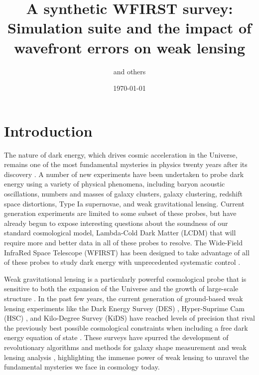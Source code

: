\documentclass[aps,prd, amsmath,amssymb,superscriptaddress,showkeys,nofootinbib,reprint,preprintnumbers]{revtex4-1}
\begin{document}
\title{A synthetic WFIRST survey: Simulation suite and the impact of wavefront errors on weak lensing}

\author{and others}


\noaffiliation

\date{\today}

\label{firstpage}

\begin{abstract}

\end{abstract}

\keywords{}

\maketitle


\section{Introduction}\label{sec:intro}

The nature of dark energy, which drives cosmic acceleration in the Universe, remains one of the most fundamental mysteries in physics twenty years after its discovery \cite{riess98,perlmutter99,detf,Frieman:2008sn,weinberg13}. 
A number of new experiments have been undertaken to probe dark energy using a variety of physical phenomena, including baryon acoustic oscillations, numbers and masses of galaxy clusters, galaxy clustering, redshift space distortions, Type Ia supernovae, and weak gravitational lensing. 
Current generation experiments are limited to some subset of these probes, but have already begun to expose interesting questions about the soundness of our standard cosmological model, Lambda-Cold Dark Matter (LCDM) that will require more and better data in all of these probes to resolve. 
The Wide-Field InfraRed Space Telescope (WFIRST) \cite{wfirst} has been designed to take advantage of all of these probes to study dark energy with unprecedented systematic control \cite{2019BAAS...51c.341D,2019arXiv190205569A}.

Weak gravitational lensing is a particularly powerful cosmological probe that is sensitive to both the expansion of the Universe and the growth of large-scale structure \cite{2001PhR...340..291B,2017arXiv171003235M}. 
In the past few years, the current generation of ground-based weak lensing experiments like the Dark Energy Survey (DES) \cite{des}, Hyper-Suprime Cam (HSC) \cite{hsc}, and Kilo-Degree Survey (KiDS) \cite{kids} have reached levels of precision that rival the previously best possible cosmological constraints when including a free dark energy equation of state \cite{2018PhRvD..98d3528T,2019PASJ...71...43H,2018arXiv181206076H}. 
These surveys have spurred the development of revolutionary algorithms and methods for galaxy shape measurement and weak lensing analysis \cite{HuffMandelbaum2017,SheldonHuff2017,shearcat}, highlighting the immense power of weak lensing to unravel the fundamental mysteries we face in cosmology today. 
\end{document}
